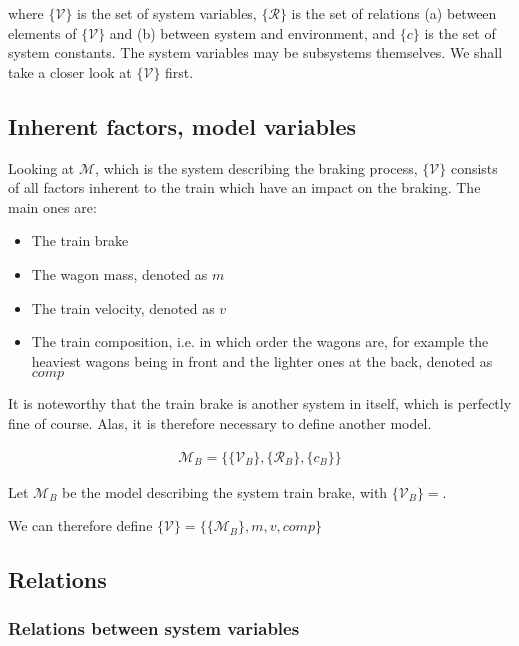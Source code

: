 \noindent
where $\{{\mathcal {V}}\}$ is the set of system variables, $\{{\mathcal {R}}\}$ is the set of relations (a) between elements of $\{{\mathcal {V}}\}$ and (b) between system and environment, and $\{c\}$ is the set of system constants. The system variables may be subsystems themselves. We shall take a closer look at $\{{\mathcal {V}}\}$ first.

\subsection{Inherent factors, model variables}
\label{sec:InherentFactors}
\par\noindent
Looking at ${\mathcal{M}}$, which is the system describing the braking process, $\{{\mathcal {V}}\}$ consists of all factors inherent to the train which have an impact on the braking. The main ones are:
\begin{itemize}
	\item The train brake
	\item The wagon mass, denoted as $m$
	\item The train velocity, denoted as $v$
	\item The train composition, i.e. in which order the wagons are, for example the heaviest wagons being in front and the lighter ones at the back, denoted as $comp$
\end{itemize}
\noindent
It is noteworthy that the train brake is another system in itself, which is perfectly fine of course. Alas, it is therefore necessary to define another model.

\begin{align*}
{\mathcal {M}}_{B} = \{ \{{\mathcal {V}}_{B}\}, \{{\mathcal{R}}_{B}\}, \{c_{B}\} \}
\end{align*}

\noindent
Let ${\mathcal{M}}_{B}$ be the model describing the system train brake, with $\{{\mathcal {V}}_{B}\} = $.
\par
We can therefore define $\{{\mathcal {V}}\} = \{\{{\mathcal {M}}_{B}\},m,v,comp\}$

\subsection{Relations}
\label{sec:Relations}
\subsubsection{Relations between system variables}
\label{sec:RelationsSystemVariables}
